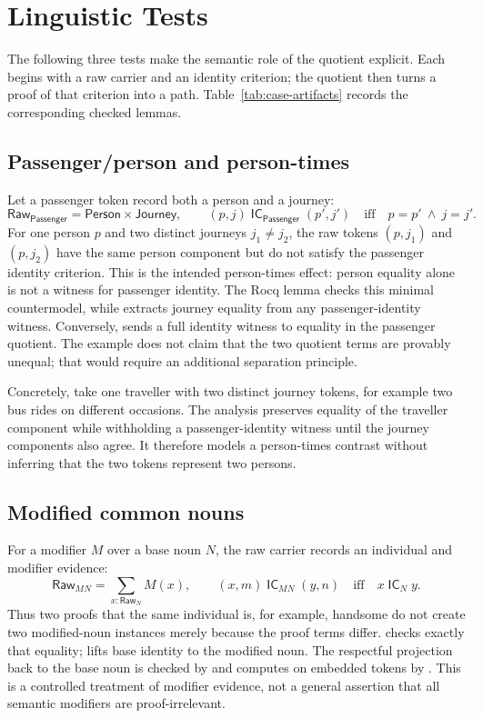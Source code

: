 \documentclass[11pt]{article}
\newcommand{\Raw}{\mathsf{Raw}}
\newcommand{\IC}{\mathsf{IC}}
\begin{document}
\section{Linguistic Tests}

The following three tests make the semantic role of the quotient explicit.
Each begins with a raw carrier and an identity criterion; the quotient then
turns a proof of that criterion into a path.  Table~\ref{tab:case-artifacts}
records the corresponding checked lemmas.

\subsection{Passenger/person and person-times}

Let a passenger token record both a person and a journey:
\[
  \Raw_{\mathsf{Passenger}} =
  \mathsf{Person}\times\mathsf{Journey},
  \qquad
  (p,j)\;\IC_{\mathsf{Passenger}}\;(p',j')
  \quad\text{iff}\quad p=p'\ \wedge\ j=j'.
\]
For one person $p$ and two distinct journeys $j_1\neq j_2$, the raw tokens
$(p,j_1)$ and $(p,j_2)$ have the same person component but do not satisfy the
passenger identity criterion.  This is the intended person-times effect:
person equality alone is not a witness for passenger identity.  The Rocq lemma
 checks this minimal countermodel,
while  extracts journey equality
from any passenger-identity witness.  Conversely,
 sends a full identity witness to equality in
the passenger quotient.  The example does not claim that the two quotient
terms are provably unequal; that would require an additional separation
principle.

Concretely, take one traveller with two distinct journey tokens, for example
two bus rides on different occasions.  The analysis preserves equality of the
traveller component while withholding a passenger-identity witness until the
journey components also agree.  It therefore models a person-times contrast
without inferring that the two tokens represent two persons.

\subsection{Modified common nouns}

For a modifier $M$ over a base noun $N$, the raw carrier records an individual
and modifier evidence:
\[
  \Raw_{M N}=\sum_{x:\Raw_N}M(x),
  \qquad
  (x,m)\;\IC_{M N}\;(y,n)
  \quad\text{iff}\quad x\;\IC_N\;y.
\]
Thus two proofs that the same individual is, for example, handsome do not
create two modified-noun instances merely because the proof terms differ.
 checks exactly that equality;
 lifts base identity to the
modified noun.  The respectful projection back to the base noun is checked by
 and computes on embedded tokens by
.  This is a controlled treatment of modifier
evidence, not a general assertion that all semantic modifiers are
proof-irrelevant.
\end{document}
